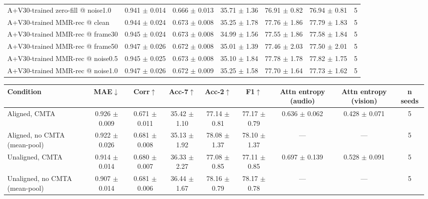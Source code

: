 \begin{tabular}{lcccccc}
A+V30-trained zero-fill @ noise1.0 & 0.941 $\pm$ 0.014 & 0.666 $\pm$ 0.013 & 35.71 $\pm$ 1.36 & 76.91 $\pm$ 0.82 & 76.94 $\pm$ 0.81 & 5 \\
A+V30-trained MMR-rec @ clean & 0.944 $\pm$ 0.024 & 0.673 $\pm$ 0.008 & 35.25 $\pm$ 1.78 & 77.76 $\pm$ 1.86 & 77.79 $\pm$ 1.83 & 5 \\
A+V30-trained MMR-rec @ frame30 & 0.945 $\pm$ 0.024 & 0.673 $\pm$ 0.008 & 34.99 $\pm$ 1.56 & 77.55 $\pm$ 1.86 & 77.58 $\pm$ 1.84 & 5 \\
A+V30-trained MMR-rec @ frame50 & 0.947 $\pm$ 0.026 & 0.672 $\pm$ 0.008 & 35.01 $\pm$ 1.39 & 77.46 $\pm$ 2.03 & 77.50 $\pm$ 2.01 & 5 \\
A+V30-trained MMR-rec @ noise0.5 & 0.945 $\pm$ 0.025 & 0.673 $\pm$ 0.008 & 35.10 $\pm$ 1.84 & 77.78 $\pm$ 1.78 & 77.82 $\pm$ 1.75 & 5 \\
A+V30-trained MMR-rec @ noise1.0 & 0.947 $\pm$ 0.026 & 0.672 $\pm$ 0.009 & 35.25 $\pm$ 1.58 & 77.70 $\pm$ 1.64 & 77.73 $\pm$ 1.62 & 5 \\
\hline
\end{tabular}


\begin{tabular}{lcccccccc}
\hline
Condition & MAE$\downarrow$ & Corr$\uparrow$ & Acc-7$\uparrow$ & Acc-2$\uparrow$ & F1$\uparrow$ & Attn entropy (audio) & Attn entropy (vision) & n seeds \\
\hline
Aligned, CMTA & 0.926 $\pm$ 0.009 & 0.671 $\pm$ 0.011 & 35.42 $\pm$ 1.10 & 77.14 $\pm$ 0.81 & 77.17 $\pm$ 0.79 & 0.636 $\pm$ 0.062 & 0.428 $\pm$ 0.071 & 5 \\
Aligned, no CMTA (mean-pool) & 0.922 $\pm$ 0.026 & 0.681 $\pm$ 0.008 & 35.13 $\pm$ 1.92 & 78.08 $\pm$ 1.37 & 78.10 $\pm$ 1.37 & — & — & 5 \\
Unaligned, CMTA & 0.914 $\pm$ 0.014 & 0.680 $\pm$ 0.007 & 36.33 $\pm$ 2.27 & 77.08 $\pm$ 0.85 & 77.11 $\pm$ 0.85 & 0.697 $\pm$ 0.139 & 0.528 $\pm$ 0.091 & 5 \\
Unaligned, no CMTA (mean-pool) & 0.907 $\pm$ 0.014 & 0.681 $\pm$ 0.006 & 36.44 $\pm$ 1.67 & 78.16 $\pm$ 0.79 & 78.17 $\pm$ 0.78 & — & — & 5 \\
\hline
\end{tabular}

